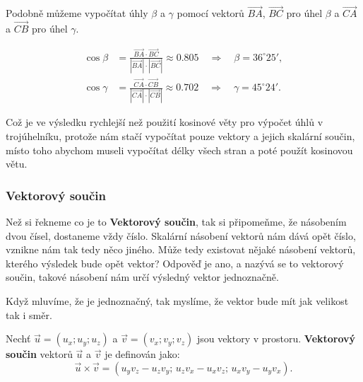 \begin{example}
    Podobně můžeme vypočítat úhly $\beta$ a $\gamma$ pomocí vektorů $\overrightarrow{BA}$, $\overrightarrow{BC}$ pro úhel $\beta$ a $\overrightarrow{CA}$ a $\overrightarrow{CB}$ pro úhel $\gamma$.

    \begin{align*}
        \cos \beta &= \frac{\overrightarrow{BA} \cdot \overrightarrow{BC}}{|\overrightarrow{BA}| \cdot |\overrightarrow{BC}|} \approx 0.805 \quad \Rightarrow \quad \beta = 36^\circ 25',\\
        \cos \gamma &= \frac{\overrightarrow{CA} \cdot \overrightarrow{CB}}{|\overrightarrow{CA}| \cdot |\overrightarrow{CB}|} \approx 0.702 \quad \Rightarrow \quad \gamma = 45^\circ 24'.
    \end{align*}

    Což je ve výsledku rychlejší než použití kosinové věty pro výpočet úhlů v trojúhelníku, 
    protože nám stačí vypočítat pouze vektory a jejich skalární součin, 
    místo toho abychom museli vypočítat délky všech stran a poté použít kosinovou větu.
\end{example}


\subsubsection{Vektorový součin}\label{subsubsec:Vector_cross_product_in_space} 
Než si řekneme co je to \textbf{Vektorový součin}, tak si připomeňme, že násobením dvou čísel, dostaneme vždy číslo.
Skalární násobení vektorů nám dává opět číslo, vznikne nám tak tedy něco jiného.
Může tedy existovat nějaké násobení vektorů, kterého výsledek bude opět vektor?
Odpověď je ano, a nazývá se to vektorový součin, takové násobení nám určí výsledný vektor jednoznačně.

\begin{remark}
    Když mluvíme, že je jednoznačný, tak myslíme, že vektor bude mít jak velikost tak i směr. 
\end{remark}

\begin{definition}\label{def:cross_product_space}
    Nechť $\vec{u} = (u_x; u_y; u_z)$ a $\vec{v} = (v_x; v_y; v_z)$ jsou vektory v prostoru. 
    \textbf{Vektorový součin} vektorů $\vec{u}$ a $\vec{v}$ je definován jako:
    \begin{equation}\label{eq:cross_product_space}
        \vec{u} \times \vec{v} = (u_y v_z - u_z v_y;\, u_z v_x - u_x v_z;\, u_x v_y - u_y v_x).
    \end{equation}
\end{definition}

